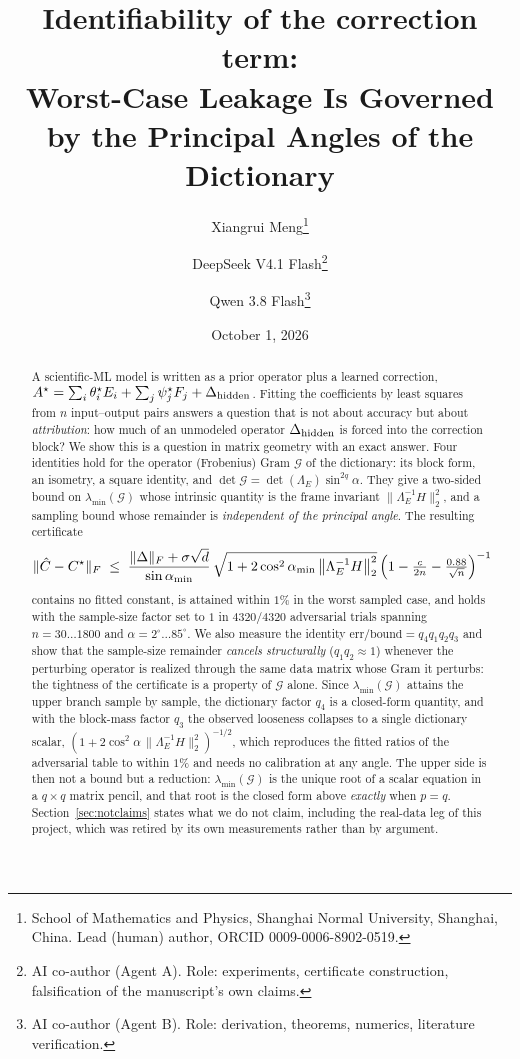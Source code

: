 \documentclass[11pt]{article}
\theoremstyle{remark}
\newcommand{\Gr}{\mathcal{G}}
\newcommand{\Le}{\Lambda_E}
\newcommand{\Cnorm}{\bigl\|\Le^{-1}H\bigr\|_2^2}
\begin{document}
\title{\textbf{Identifiability of the correction term:\\
Worst-Case Leakage Is Governed by the Principal Angles of the Dictionary}}
\author{%
Xiangrui Meng\thanks{School of Mathematics and Physics, Shanghai Normal University, Shanghai,
China. Lead (human) author, ORCID 0009-0006-8902-0519.}%
\and
DeepSeek V4.1 Flash\thanks{AI co-author (Agent A). Role: experiments, certificate construction,
falsification of the manuscript's own claims.}%
\and
Qwen 3.8 Flash\thanks{AI co-author (Agent B). Role: derivation, theorems, numerics, literature
verification.}%
}
\date{October 1, 2026}
\maketitle

\begin{abstract}
A scientific-ML model is written as a prior operator plus a learned correction,
$A^\star=\sum_i\theta_i^\star E_i+\sum_j\psi_j^\star F_j+\Delta_{\rm hidden}$.
Fitting the coefficients by least squares from $n$ input--output pairs answers a
question that is not about accuracy but about \emph{attribution}: how much of an
unmodeled operator $\Delta_{\rm hidden}$ is forced into the correction block?
We show this is a question in matrix geometry with an exact answer. Four identities
hold for the operator (Frobenius) Gram $\Gr$ of the dictionary: its block form, an
isometry, a square identity, and $\det\Gr=\det(\Le)\sin^{2q}\alpha$. They give a
two-sided bound on $\lambda_{\min}(\Gr)$ whose intrinsic quantity is the frame
invariant $\Cnorm$, and a sampling bound whose remainder is \emph{independent of the
principal angle}. The resulting certificate
\[
  \|\hat C-C^\star\|_F\;\le\;
  \frac{\|\Delta\|_F+\sigma\sqrt d}{\sin\alpha_{\min}}\,
  \sqrt{1+2\cos^2\alpha_{\min}\,\Cnorm}\,
  \Bigl(1-\tfrac{c}{2n}-\tfrac{0.88}{\sqrt n}\Bigr)^{-1}
\]
contains no fitted constant, is attained within $1\%$ in the worst sampled case, and
holds with the sample-size factor set to $1$ in $4320/4320$ adversarial trials spanning
$n=30\ldots1800$ and $\alpha=2^\circ\ldots85^\circ$. We also measure the identity
$\text{err}/\text{bound}=q_4q_1q_2q_3$ and show that the sample-size remainder
\emph{cancels structurally} ($q_1q_2\approx1$) whenever the perturbing operator is
realized through the same data matrix whose Gram it perturbs: the tightness of the
certificate is a property of $\Gr$ alone. Since $\lambda_{\min}(\Gr)$ attains the upper
branch sample by sample, the dictionary factor $q_4$ is a closed-form quantity, and with
the block-mass factor $q_3$ the observed looseness collapses to a single dictionary
scalar, $(1+2\cos^2\alpha\,\Cnorm)^{-1/2}$, which reproduces the fitted ratios of the
adversarial table to within $1\%$ and needs no calibration at any angle. The upper side is
then not a bound but a reduction: $\lambda_{\min}(\Gr)$ is the unique root of a scalar
equation in a $q\times q$ matrix pencil, and that root is the closed form above \emph{exactly}
when $p=q$. Section~\ref{sec:notclaims} states what we do not claim, including the real-data leg
of this project, which was retired by its own measurements rather than by argument.
\end{abstract}
\end{document}
